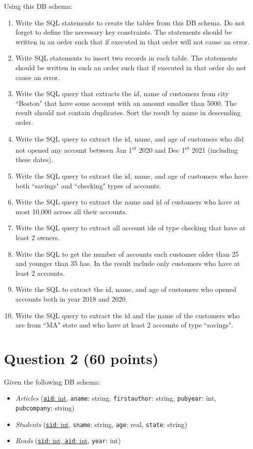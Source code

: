 \documentclass[letterpaper, 11pt]{article}
\begin{document}
Using this DB schema:
\begin{enumerate}[label={\alph*}),leftmargin=*]
    \item Write the SQL statements to create the tables from this DB schema. Do not forget to define the necessary key constraints. The statements should be written in an order such that if executed in that order will not cause an error.
    \item Write SQL statements to insert two records in each table. The statements should be written in such an order such that if executed in that order do not cause an error.
    \item Write the SQL query that extracts the id, name of customers from city ``Boston" that have some account with an amount smaller than 5000.  The result should not contain duplicates. Sort the result by name in descending order.
    \item Write the SQL query to extract the id, name, and age of customers who did not opened any account between Jan 1\textsuperscript{st} 2020 and Dec 1\textsuperscript{st} 2021 (including these dates).
    \item Write the SQL query to extract the id, name, and age of customers who have both ``savings" and ``checking" types of accounts.
    \item Write the SQL query to extract the name and id of customers who have at most 10,000 across all their accounts.
    \item Write the SQL query to extract all account ids of type checking that have at least 2 owners.
    \item Write the SQL to get the number of accounts each customer older than 25 and younger than 35 has. In the result include only customers who have at least 2 accounts.
    \item Write the SQL to extract the id, name, and age of customers who opened accounts both in year 2018 and 2020.
    \item Write the SQL query to extract the id and the name of the customers who are from ``MA" state and who have at least 2 accounts of type ``savings". 
\end{enumerate}

\section*{Question 2 (60 points)}

Given the following DB schema:
\begin{itemize}
    \item \textit{Articles} (\ul{\texttt{aid}: int}, \texttt{aname}: string, \texttt{first\textunderscore author}: string, \texttt{pubyear}: int, \texttt{pubcompany}: string)
    \item \textit{Students} (\ul{\texttt{sid}: int}, \texttt{sname}: string, \texttt{age}: real, \texttt{state}: string)
    \item \textit{Reads} (\ul{\texttt{sid}: int, \texttt{aid}: int}, \texttt{year}: int) 
\end{itemize}
\end{document}
